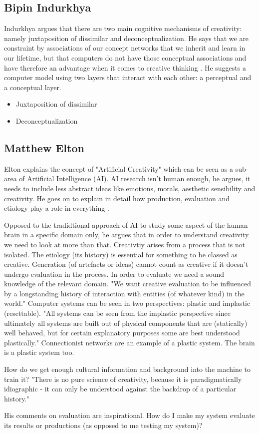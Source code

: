 \subsection{Bipin Indurkhya}

Indurkhya argues that there are two main cognitive mechanisms of creativity: namely juxtaposition of dissimilar and deconceptualization. He says that we are constraint by associations of our concept networks that we inherit and learn in our lifetime, but that computers do not have those conceptual associations and have therefore an advantage when it comes to creative thinking \citep{Indurkhya}. He suggests a computer model using two layers that interact with each other: a perceptual and a conceptual layer.

\begin{itemize}
  \item Juxtaposition of dissimilar
  \item Deconceptualization
\end{itemize}

\subsection{Matthew Elton}

Elton explains the concept of "Artificial Creativity" which can be seen as a sub-area of Artificial Intelligence (AI). AI research isn't human enough, he argues, it needs to include less abstract ideas like emotions, morals, aesthetic sensibility and creativity. He goes on to explain in detail how production, evaluation and etiology play a role in everything \citep{Elton1995}.

Opposed to the tradidtional approach of AI to study  some aspect of the human brain in a specific domain only, he argues that in order to understand creativity we need to look at more than that. Creativtiy arises from a process that is not isolated. The etiology (its history) is essential for something to be classed as creative. Generation (of artefacts or ideas) cannot count as creative if it doesn't undergo evaluation in the process. In order to evaluate we need a sound knowledge of the relevant domain. "We want creative evaluation to be influenced by a longstanding history of interaction with entities (of whatever kind) in the world." Computer systems can be seen in two perspectives: plastic and implastic (resettable). "All systems can be seen from the implastic perspective since ultimately all systems are built out of physical components that are (statically) well behaved, but for certain explanatory purposes some are best understood plastically." Connectionist networks are an example of a plastic system. The brain is a plastic system too.

How do we get enough cultural information and background into the machine to train it? "There is no pure science of creativity, because it is paradigmatically idiographic - it can only be understood against the backdrop of a particular history."

His comments on evaluation are inspirational. How do I make my system evaluate its results or productions (as opposed to me testing my system)?

